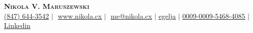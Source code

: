 \begin{center}
  \textbf{\Huge \scshape Nikola V. Maruszewski} \\
  \vspace{3pt}%
  \small%
  \faPhone* \href{tel:(847) 644-3542}{(847) 644-3542}
  $|$ \faGlobe\,\,\href{https://www.nikola.cx}{\underline{www.nikola.cx}}
  $|$ \faEnvelope\,\,\href{mailto:me@nikola.cx}{\underline{me@nikola.cx}}
  $|$  \href{https://github.com/egelja}{\underline{egelja}}
  $|$  \href{https://orcid.org/0009-0009-5468-4085}{\underline{0009-0009-5468-4085}}
  $|$  \href{https://www.linkedin.com/in/nikola-maruszewski/}{\underline{Linkedin}}
\end{center}

